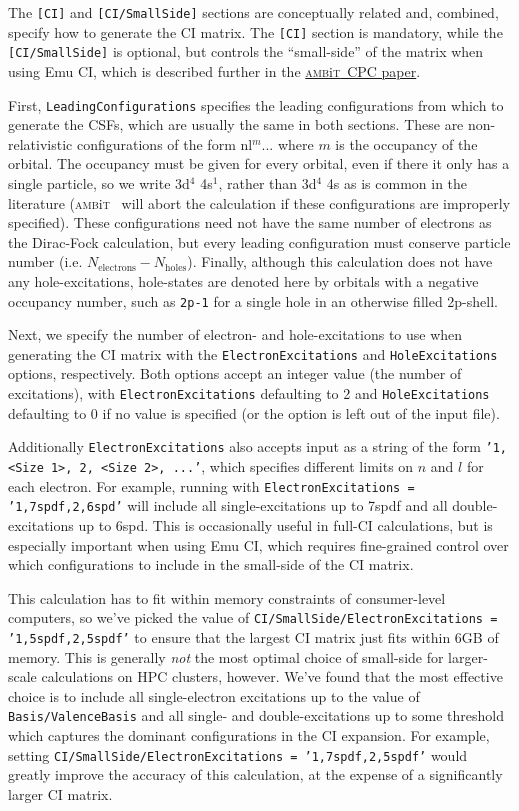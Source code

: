 \documentclass{report}
\newcommand{\ambit}{\textsc{amb}{\footnotesize i}\textsc{t}}
\begin{document}
The \texttt{[CI]} and \texttt{[CI/SmallSide]} sections are conceptually related and, combined, specify 
how to generate the CI matrix. The \texttt{[CI]} section is mandatory, while the \texttt{[CI/SmallSide]}
is optional, but controls the ``small-side'' of the matrix when using Emu CI, which is described further
in the \href{link_goes_here}{\ambit\  CPC paper}.

First, \texttt{LeadingConfigurations} specifies the leading configurations from which to generate the 
CSFs, which are usually the
same in both sections. These are non-relativistic configurations of the form nl$^{m}...$ where $m$ is 
the occupancy of the orbital. The occupancy must be given for every orbital, even if there it only has a
single particle, so we write 3d$^4$ 4s$^1$, rather than 3d$^4$ 4s as is common in the literature (\ambit
~will abort the calculation if these configurations are improperly specified). These configurations need
not have the same number of electrons as the Dirac-Fock calculation, but every leading configuration
must conserve particle number (i.e. $N_{\mathrm{electrons}} - N_{\mathrm{holes}}$). Finally, although
this calculation does not have any hole-excitations, hole-states are denoted here by orbitals with a
negative occupancy number, such as \texttt{2p-1} for a single hole in an otherwise filled 2p-shell.

Next, we specify the number of electron- and hole-excitations to use when generating the CI matrix with
the \texttt{ElectronExcitations} and \texttt{HoleExcitations} options, respectively. Both options accept
an integer value (the number of excitations), with \texttt{ElectronExcitations} defaulting to 2 and
\texttt{HoleExcitations} defaulting to 0 if no value is specified (or the option is left out of the
input file).

Additionally \texttt{ElectronExcitations} also accepts input as a string of the form 
\texttt{'1, <Size 1>, 2, <Size 2>, ...'}, which specifies different limits on $n$ and $l$ for each 
electron. For example, running with \texttt{ElectronExcitations = '1,7spdf,2,6spd'} will include all
single-excitations up to 7spdf and all double-excitations up to 6spd. This is occasionally useful in
full-CI calculations, but is especially important when using Emu CI, which requires fine-grained control
over which configurations to include in the small-side of the CI matrix. 

This calculation has to fit within memory constraints of consumer-level computers, so we've picked the
value of \texttt{CI/SmallSide/ElectronExcitations = '1,5spdf,2,5spdf'} to ensure that the largest CI 
matrix just fits within 6GB of memory. This is generally \emph{not} the most optimal choice of
small-side for larger-scale calculations on HPC clusters, however. We've found that the most effective
choice is to include all single-electron excitations up to the value of \texttt{Basis/ValenceBasis} and
all single- and double-excitations up to some threshold which captures the dominant configurations in
the CI expansion. For example, setting \texttt{CI/SmallSide/ElectronExcitations = '1,7spdf,2,5spdf'}
would greatly improve the accuracy of this calculation, at the expense of a significantly larger CI
matrix.
\end{document}
